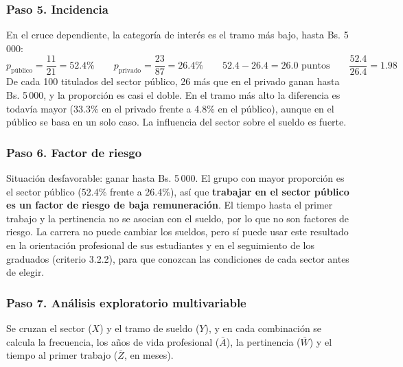 \documentclass[12pt, a4paper]{article}
\begin{document}
\subsubsection{Paso 5. Incidencia}

En el cruce dependiente, la categoría de interés es el tramo más bajo,
hasta Bs. 5\,000:
\[
p_{\text{público}} = \frac{11}{21} = 52.4\% \qquad
p_{\text{privado}} = \frac{23}{87} = 26.4\% \qquad
52.4 - 26.4 = 26.0 \text{ puntos} \qquad
\frac{52.4}{26.4} = 1.98
\]
De cada 100 titulados del sector público, 26 más que en el privado ganan
hasta Bs. 5\,000, y la proporción es casi el doble. En el tramo más alto
la diferencia es todavía mayor (33.3\% en el privado frente a 4.8\% en el
público), aunque en el público se basa en un solo caso. La influencia del
sector sobre el sueldo es fuerte.

\subsubsection{Paso 6. Factor de riesgo}

Situación desfavorable: ganar hasta Bs. 5\,000. El grupo con mayor
proporción es el sector público (52.4\% frente a 26.4\%), así que
\textbf{trabajar en el sector público es un factor de riesgo de baja
remuneración}. El tiempo hasta el primer trabajo y la pertinencia no se
asocian con el sueldo, por lo que no son factores de riesgo. La carrera
no puede cambiar los sueldos, pero sí puede usar este resultado en la
orientación profesional de sus estudiantes y en el seguimiento de los
graduados (criterio 3.2.2), para que conozcan las condiciones de cada
sector antes de elegir.

\subsubsection{Paso 7. Análisis exploratorio multivariable}

Se cruzan el sector ($X$) y el tramo de sueldo ($Y$), y en cada
combinación se calcula la frecuencia, los años de vida profesional
($\bar{A}$), la pertinencia ($\bar{W}$) y el tiempo al primer trabajo
($\bar{Z}$, en meses).
\end{document}
